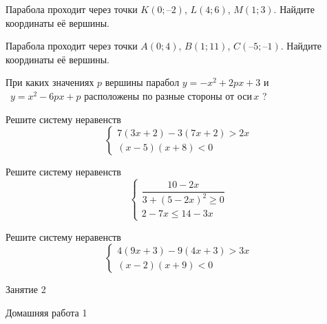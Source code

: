 \begin{class}[number=1]
\begin{listofex}
	\item Парабола проходит через точки \(  K(0; –2) \), \(  L(4; 6) \), \( M(1; 3) \). Найдите координаты её вершины.
	\item Парабола проходит через точки \( A(0; 4) \), \( B(1; 11) \), \( C(–5; –1) \). Найдите координаты её вершины.
	\item При каких значениях \(  p \) вершины парабол \( y=-x^{2}+2px+3 \) и \\\ \( y=x^{2}-6px+p \) расположены по разные стороны от оси \( x \) ?
	\item Решите систему неравенств  
	\begin{equation*}
		\begin{cases}
			7(3x+2)-3(7x+2)>2x
			\\
			(x-5)(x+8)<0
		\end{cases}
	\end{equation*}
	\item Решите систему неравенств  
	\begin{equation*}
		\begin{cases}
			\dfrac{10-2x}{3+(5-2x)^{2}\geq0}
			\\
			2-7x\leq14-3x
		\end{cases}
	\end{equation*}
	\item Решите систему неравенств  
	\begin{equation*}
		\begin{cases}
			4(9x+3)-9(4x+3)>3x
			\\
			(x-2)(x+9)<0
		\end{cases}
	\end{equation*}
	\end{listofex}
	
\end{class}

\begin{class}[number=2]
	\begin{listofex}
		\item Занятие 2
	\end{listofex}
\end{class}

\begin{homework}[number=1]
	\begin{listofex}
		\item Домашняя работа 1
	\end{listofex}
\end{homework}

